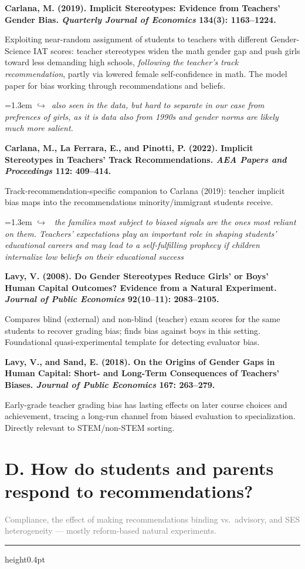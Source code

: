\documentclass[11pt]{article}
\newcommand{\entry}[3]{%
  \par\medskip\noindent\textbf{#1}\par
  \nopagebreak #2\hspace{0.35em}{\small\color{tagcol}[#3]}\par}
\newcommand{\note}[1]{\par\smallskip\noindent\hangindent=1.3em
  \textcolor{notecol}{\footnotesize$\hookrightarrow$~\textit{#1}}}
\newcommand{\secintro}[1]{\par\smallskip\noindent\textcolor{grey}{\small #1}\par
  \vspace{2pt}\hrule height0.4pt\vspace{4pt}}
\begin{document}
\entry{Carlana, M. (2019). Implicit Stereotypes: Evidence from Teachers' Gender
Bias. \textit{Quarterly Journal of Economics} 134(3): 1163--1224.}
{Exploiting near-random assignment of students to teachers with different Gender-Science
IAT scores: teacher stereotypes widen the math gender gap and push girls toward less
demanding high schools, \emph{following the teacher's track recommendation}, partly via
lowered female self-confidence in math. The model paper for bias working through
recommendations and beliefs.}{RF}
\note{also seen in the data, but hard to separate in our case from prefrences of girls, as it is data also from 1990s and gender norms are likely much more salient.}

\entry{Carlana, M., La Ferrara, E., and Pinotti, P. (2022). Implicit Stereotypes in
Teachers' Track Recommendations. \textit{AEA Papers and Proceedings} 112: 409--414.}
{Track-recommendation-specific companion to Carlana (2019): teacher implicit bias maps
into the recommendations minority/immigrant students receive.}{RF}
\note{ the families most subject to biased signals are the ones most reliant on them. Teachers’ expectations play an important role in shaping students’ educational
careers and may lead to a self-fulfilling
prophecy if children internalize low beliefs
on their educational success}


\entry{Lavy, V. (2008). Do Gender Stereotypes Reduce Girls' or Boys' Human Capital
Outcomes? Evidence from a Natural Experiment. \textit{Journal of Public Economics}
92(10--11): 2083--2105.}
{Compares blind (external) and non-blind (teacher) exam scores for the same students to
recover grading bias; finds bias against boys in this setting. Foundational
quasi-experimental template for detecting evaluator bias.}{RF}

\entry{Lavy, V., and Sand, E. (2018). On the Origins of Gender Gaps in Human Capital:
Short- and Long-Term Consequences of Teachers' Biases. \textit{Journal of Public
Economics} 167: 263--279.}
{Early-grade teacher grading bias has lasting effects on later course choices and
achievement, tracing a long-run channel from biased evaluation to specialization.
Directly relevant to STEM/non-STEM sorting.}{RF}


\section{D. How do students and parents respond to recommendations?}
\secintro{Compliance, the effect of making recommendations binding vs.\ advisory, and
SES heterogeneity --- mostly reform-based natural experiments.}
\end{document}
